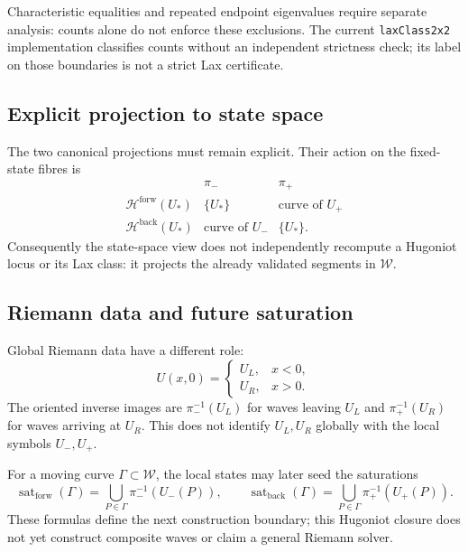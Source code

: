 Characteristic equalities and repeated endpoint eigenvalues require separate
analysis: counts alone do not enforce these exclusions.  The current
\texttt{laxClass2x2} implementation classifies counts without an independent
strictness check; its label on those boundaries is not a strict Lax certificate.

\subsection{Explicit projection to state space}
The two canonical projections must remain explicit.  Their action on the fixed-state fibres is
\[
\begin{array}{c|cc}
 &\pi_-&\pi_+\\ \hline
 \mathcal H^{\mathrm{forw}}(U_*)&\{U_*\}&\text{curve of }U_+\\
 \mathcal H^{\mathrm{back}}(U_*)&\text{curve of }U_-&\{U_*\}.
\end{array}
\]
Consequently the state-space view does not independently recompute a Hugoniot locus or its Lax class: it projects the already validated segments in $\mathcal W$.

\subsection{Riemann data and future saturation}
Global Riemann data have a different role:
\[
 U(x,0)=\begin{cases}U_L,&x<0,\\U_R,&x>0.\end{cases}
\]
The oriented inverse images are $\pi_-^{-1}(U_L)$ for waves leaving $U_L$ and $\pi_+^{-1}(U_R)$ for waves arriving at $U_R$.  This does not identify $U_L,U_R$ globally with the local symbols $U_-,U_+$.

For a moving curve $\Gamma\subset\mathcal W$, the local states may later seed the saturations
\[
 \operatorname{sat}_{\mathrm{forw}}(\Gamma)=
 \bigcup_{P\in\Gamma}\pi_-^{-1}(U_-(P)),\qquad
 \operatorname{sat}_{\mathrm{back}}(\Gamma)=
 \bigcup_{P\in\Gamma}\pi_+^{-1}(U_+(P)).
\]
These formulas define the next construction boundary; this Hugoniot closure does not yet construct composite waves or claim a general Riemann solver.
